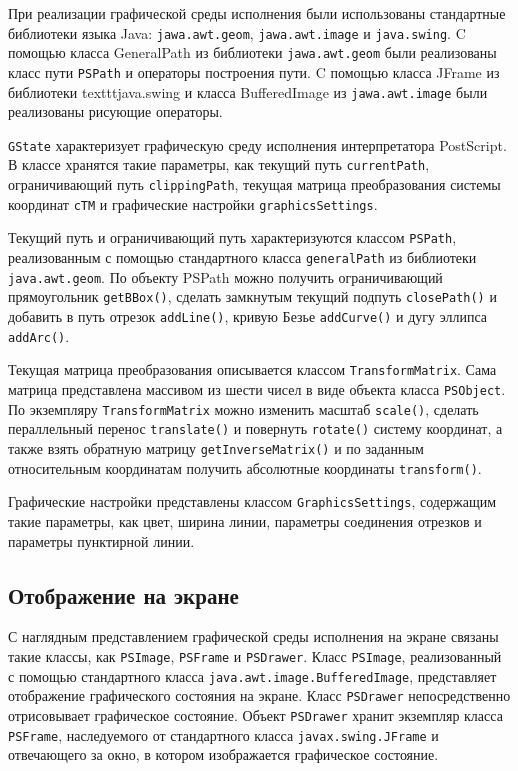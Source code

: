 \documentclass[14pt]{extarticle}
\begin{document}
При реализации графической среды исполнения были использованы стандартные библиотеки языка Java: \texttt{jawa.awt.geom}, \texttt{jawa.awt.image} и \texttt{java.swing}. C помощью класса GeneralPath из библиотеки \texttt{jawa.awt.geom} были реализованы класс пути \texttt{PSPath} и операторы построения пути. C помощью класса JFrame из библиотеки texttt{java.swing} и класса BufferedImage из \texttt{jawa.awt.image} были реализованы рисующие операторы.

\texttt{GState} характеризует графическую среду исполнения интерпретатора PostScript. В классе хранятся такие параметры, как текущий путь \texttt{currentPath}, ограничивающий путь \texttt{clippingPath}, текущая матрица преобразования системы координат \texttt{cTM} и графические настройки \texttt{graphicsSettings}.

Текущий путь и ограничивающий путь характеризуются классом \texttt{PSPath}, реализованным с помощью стандартного класса \texttt{generalPath} из библиотеки \texttt{java.awt.geom}. По объекту PSPath можно получить ограничивающий прямоугольник \texttt{getBBox()}, сделать замкнутым текущий подпуть \texttt{closePath()} и добавить в путь отрезок \texttt{addLine()}, кривую Безье \texttt{addCurve()} и дугу эллипса \texttt{addArc()}.

Текущая матрица преобразования описывается классом \texttt{TransformMatrix}. Сама матрица представлена массивом из шести чисел в виде объекта класса \texttt{PSObject}. По экземпляру \texttt{TransformMatrix} можно изменить масштаб \texttt{scale()}, сделать пераллельный перенос \texttt{translate()} и повернуть \texttt{rotate()} систему координат, а также взять обратную матрицу \texttt{getInverseMatrix()} и по заданным относительным координатам получить абсолютные координаты \texttt{transform()}.

Графические настройки представлены классом \texttt{GraphicsSettings}, содержащим такие параметры, как цвет, ширина линии, параметры соединения отрезков и параметры пунктирной линии. 

\pagebreak
\subsection{Отображение на экране}
\sloppy

С наглядным представлением графической среды исполнения на экране связаны такие классы, как \texttt{PSImage}, \texttt{PSFrame} и \texttt{PSDrawer}.
Класс \texttt{PSImage}, реализованный с помощью стандартного класса \texttt{java.awt.image.BufferedImage}, представляет отображение графического состояния на экране. Класс \texttt{PSDrawer} непосредственно отрисовывает графическое состояние. Объект \texttt{PSDrawer} хранит экземпляр класса \texttt{PSFrame}, наследуемого от стандартного класса \texttt{javax.swing.JFrame} и отвечающего за окно, в котором изображается графическое состояние. 
\end{document}
